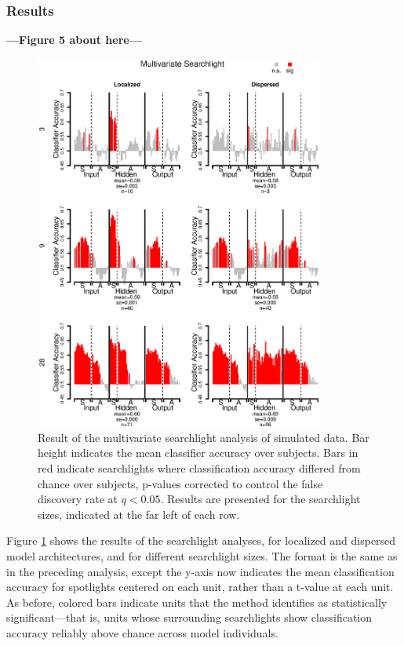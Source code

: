 \subsubsection{Results} 
\textbf{---Figure 5 about here---}
\begin{figure}
\centering
\includegraphics[width=0.85\textwidth]{figures/searchlight.eps}
\caption{\label{fig.searchlight} Result of the multivariate searchlight analysis of simulated data. Bar height indicates the mean classifier accuracy over subjects. Bars in red indicate searchlights where classification accuracy differed from chance over subjects, p-values corrected to control the false discovery rate at $q<0.05$. Results are presented for the searchlight sizes, indicated at the far left of each row.}
\end{figure}

Figure \ref{fig.searchlight} shows the results of the searchlight analyses, for localized and dispersed model architectures, and for different searchlight sizes. The format is the same as in the preceding analysis, except the y-axis now indicates the mean classification accuracy for spotlights centered on each unit, rather than a t-value at each unit. As before, colored bars indicate units that the method identifies as statistically significant---that is, units whose surrounding searchlights show classification accuracy reliably above chance across model individuals.

